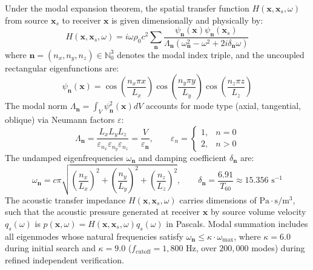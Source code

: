 \documentclass[11pt,a4paper]{article}
\begin{document}
Under the modal expansion theorem, the spatial transfer function $H(\mathbf{x}, \mathbf{x}_s, \omega)$ from source $\mathbf{x}_s$ to receiver $\mathbf{x}$ is given dimensionally and physically by:
\begin{equation}
    H(\mathbf{x}, \mathbf{x}_s, \omega) = i \omega \rho_0 c^2 \sum_{\mathbf{n}} \frac{\psi_{\mathbf{n}}(\mathbf{x}) \psi_{\mathbf{n}}(\mathbf{x}_s)}{\Lambda_{\mathbf{n}} \left( \omega_{\mathbf{n}}^2 - \omega^2 + 2 i \delta_{\mathbf{n}} \omega \right)}
\end{equation}
where $\mathbf{n} = (n_x, n_y, n_z) \in \mathbb{N}_0^3$ denotes the modal index triple, and the uncoupled rectangular eigenfunctions are:
\begin{equation}
    \psi_{\mathbf{n}}(\mathbf{x}) = \cos\left(\frac{n_x \pi x}{L_x}\right) \cos\left(\frac{n_y \pi y}{L_y}\right) \cos\left(\frac{n_z \pi z}{L_z}\right)
\end{equation}
The modal norm $\Lambda_{\mathbf{n}} = \int_V \psi_{\mathbf{n}}^2(\mathbf{x}) dV$ accounts for mode type (axial, tangential, oblique) via Neumann factors $\varepsilon$:
\begin{equation}
    \Lambda_{\mathbf{n}} = \frac{L_x L_y L_z}{\varepsilon_{n_x} \varepsilon_{n_y} \varepsilon_{n_z}} = \frac{V}{\varepsilon_{\mathbf{n}}}, \qquad \varepsilon_n = \begin{cases} 1, & n = 0 \\ 2, & n > 0 \end{cases}
\end{equation}
The undamped eigenfrequencies $\omega_{\mathbf{n}}$ and damping coefficient $\delta_{\mathbf{n}}$ are:
\begin{equation}
    \omega_{\mathbf{n}} = c \pi \sqrt{\left(\frac{n_x}{L_x}\right)^2 + \left(\frac{n_y}{L_y}\right)^2 + \left(\frac{n_z}{L_z}\right)^2}, \qquad \delta_{\mathbf{n}} = \frac{6.91}{T_{60}} \approx 15.356\text{ s}^{-1}
\end{equation}
The acoustic transfer impedance $H(\mathbf{x}, \mathbf{x}_s, \omega)$ carries dimensions of $\text{Pa} \cdot \text{s} / \text{m}^3$, such that the acoustic pressure generated at receiver $\mathbf{x}$ by source volume velocity $q_s(\omega)$ is $p(\mathbf{x}, \omega) = H(\mathbf{x}, \mathbf{x}_s, \omega) q_s(\omega)$ in Pascals. Modal summation includes all eigenmodes whose natural frequencies satisfy $\omega_{\mathbf{n}} \le \kappa \cdot \omega_{\max}$, where $\kappa = 6.0$ during initial search and $\kappa = 9.0$ ($f_{\text{cutoff}} = 1,800\text{ Hz}$, over $200,000$ modes) during refined independent verification.
\end{document}
